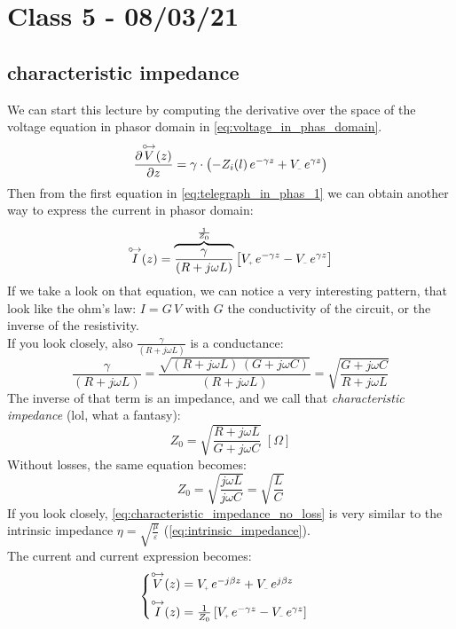 \section{Class 5 - 08/03/21}
\subsection*{characteristic impedance}
We can start this lecture by computing the derivative over the space of the voltage equation in phasor domain in \cref{eq:voltage_in_phas_domain}.
\begin{equation}
    \frac{\partial \phas{V}(z)}{\partial z}=\gamma \cdot \left(-Z_i(l)\,e^{-\gamma z}+V\bottomMinus \,e^{\gamma z}\right) 
\end{equation}
Then from the first equation in \cref{eq:telegraph_in_phas_1} we can obtain another way to express the current in phasor domain:
\begin{equation}
    \phas{I}(z)=\overbrace{\frac{\gamma}{(R+j\omega L)}}^{\frac{1}{Z_0}}\left[V\bottomPlus \,e^{-\gamma z}-V\bottomMinus \,e^{\gamma z}\right]
\end{equation}
If we take a look on that equation, we can notice a very interesting pattern, that look like the ohm's law: $I=G\,V$ with $G$ the conductivity of the circuit, or the inverse of the resistivity.\\
If you look closely, also $\frac{\gamma}{(R+j\omega L)}$ is a conductance:
\begin{equation}
    \frac{\gamma}{(R+j\omega L)}=\frac{\sqrt{(R+j\omega L)\,(G+j\omega C)}}{(R+j\omega L)}=\sqrt{\frac{G+j\omega C}{R+j\omega L}}
\end{equation}
The inverse of that term is an impedance, and we call that \emph{characteristic impedance} (lol, what a fantasy):
\begin{equation}
    Z_0=\sqrt{\frac{R+j\omega L}{G+j\omega C}}\;\left[\Omega \right]
\end{equation}
Without losses, the same equation becomes:
\begin{equation} \label{eq:characteristic_impedance_no_loss}
    Z_0=\sqrt{\frac{j\omega L}{j\omega C}}=\sqrt{\frac{L}{C}}
\end{equation}
If you look closely, \cref{eq:characteristic_impedance_no_loss} is very similar to the intrinsic impedance $\eta = \sqrt{\frac{\mu}{\varepsilon}}$ (\cref{eq:intrinsic_impedance}).\\
The current and current expression becomes:
\begin{equation}
    \begin{cases}
    \phas{V}(z) = V\bottomPlus \,e^{-j\beta z}+V\bottomMinus \,e^{j\beta z} \\[5pt]
    \phas{I}(z)=\frac{1}{Z_0}\left[V\bottomPlus \,e^{-\gamma z}-V\bottomMinus \,e^{\gamma z}\right]
    \end{cases}\label{eq:current_and_voltage_in_TL_phas}
\end{equation}
